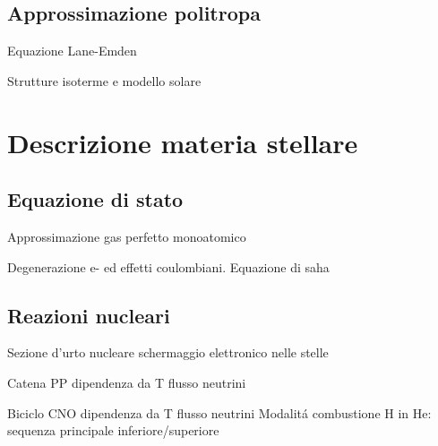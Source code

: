 \subsection{Approssimazione politropa}

\begin{frame}{Equazione Lane-Emden}

\end{frame}

\begin{frame}{Strutture isoterme e modello solare}

\end{frame}


\section{Descrizione materia stellare}

\subsection{Equazione di stato}

\begin{frame}{Approssimazione gas perfetto monoatomico}

\end{frame}

\begin{frame}{Degenerazione e- ed effetti coulombiani. Equazione di saha}

\end{frame}

\subsection{Reazioni nucleari}

\begin{frame}{Sezione d'urto nucleare}
schermaggio elettronico nelle stelle
\end{frame}

\begin{frame}{Catena PP}
dipendenza da T
flusso neutrini
\end{frame}

\begin{frame}{Biciclo CNO}
dipendenza da T
flusso neutrini
Modalit\'a combustione H in He: sequenza principale inferiore/superiore
\end{frame}

